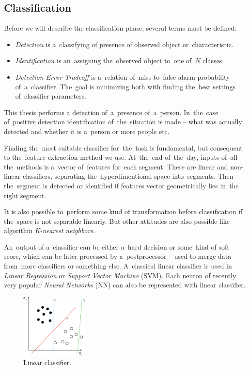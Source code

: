 \subsection*{Classification}
Before we will describe the classification phase, several terms must be defined: 
\begin{itemize}
\item {\it Detection} is a~classifying of presence of observed object or~characteristic.
\item {\it Identification} is an~assigning the~observed object to~one of~$N$ classes.
\item {\it Detection Error Tradeoff} is a~relation of~miss to~false alarm probability of~a~classifier.
The~goal is minimizing both with finding the~best settings of~classifier parameters.
\end{itemize}
This thesis performs a detection of~a~presence of~a~person. In~the~case of~positive detection identification
of~the~situation is made -- what was actually detected and whether it is a~person or more people etc.

Finding the~most suitable classifier for~the~task is fundamental, but consequent to the~feature extraction
method we use. At~the~end of~the~day, inputs of~all the~methods is a~vector of~features for~each segment.
There are linear and non-linear classifiers, separating the~hyperdimentional space into~segments. Then
the~segment is detected or identified if features vector geometrically lies in~the right segment. 

It is also possible to~perform some kind of transformation before classification if the~space is not separable
linearly. But other attitudes are also possible like algorithm {\it K-nearest neighbors}.

An~output of a~classifier can be either a~hard decision or some~kind of soft score, which can be later processed
by a~postprocessor -- used to merge data from~more classifiers or something else. A~classical linear classifier
is used in {\it Linear Regression} or {\it Support Vector Machine} (SVM). Each neuron of recently very popular
{\it Neural Networks} (NN) can also be represented with linear classifier.

\begin{figure}[h!]
\begin{center}
\includegraphics[width=0.3\textwidth]{img/linear.png}
\caption{Linear classifier.\cite{LinearClassifier}\label{fig:linearclassifier}}
\end{center}
\end{figure}

